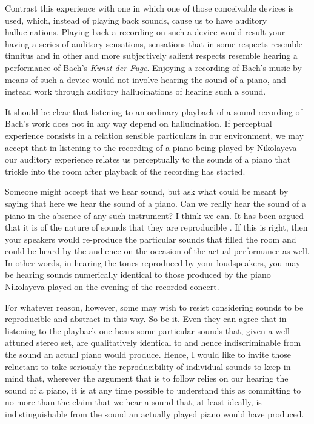 \documentclass[sloppy, journal, git, bytitle, dodraft]{humapap}
\begin{document}
Contrast this experience with one in which one of those conceivable devices is used, which, instead of playing back sounds, cause us to have auditory hallucinations. Playing back a recording on such a device would result your having a series of auditory sensations, sensations that in some respects resemble tinnitus and in other and more subjectively salient respects resemble hearing a performance of Bach's \emph{Kunst der Fuge}. Enjoying a recording of Bach's music by means of such a device would not involve hearing the sound of a piano, and instead work through auditory hallucinations of hearing such a sound. 

It should be clear that listening to an ordinary playback of a sound recording of Bach's work does not in any way depend on hallucination. If perceptual experience consists in a relation sensible particulars in our environment, we may accept that in listening to the recording of a piano being played by Nikolayeva our auditory experience relates us perceptually to the sounds of a piano that trickle into the room after playback of the recording has started.

Someone might accept that we hear sound, but ask what could be meant by saying that here we hear the sound of a piano. Can we really hear the sound of a piano in the absence of any such instrument? I think we can. It has been argued that it is of the nature of sounds that they are reproducible \autocite{martin2012aa}. If this is right, then your speakers would re-produce the particular sounds that filled the room and could be heard by the audience on the occasion of the actual performance as well. In other words, in hearing the tones reproduced by your loudspeakers, you may be hearing sounds numerically identical to those produced by the piano Nikolayeva played on the evening of the recorded concert. 

For whatever reason, however, some may wish to resist considering sounds to be reproducible and abstract in this way. So be it. Even they can agree that in listening to the playback one hears some particular sounds that, given a well-attuned stereo set, are qualitatively identical to and hence indiscriminable from the sound an actual piano would produce. Hence, I would like to invite those reluctant to take seriously the reproducibility of individual sounds to keep in mind that, wherever the argument that is to follow relies on our hearing the sound of a piano, it is at any time possible to understand this as committing to no more than the claim that we hear a sound that, at least ideally, is indistinguishable from the sound an actually played piano would have produced. 
\end{document}
